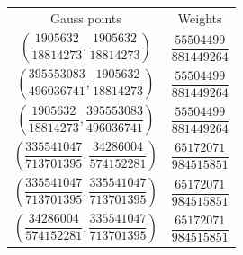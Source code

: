 \documentclass[12pt]{article}
\begin{document}
\begin{minipage}{0.58\textwidth}
  \vspace{0.3cm}
  \vfill\centering
  \begin{tabular}{c|c}
    Gauss points                                                              & Weights                       \\[15pt]
    $\left(\dfrac{1905632}{18814273},\dfrac{1905632}{18814273}\right)$        & $\dfrac{55504499}{881449264}$ \\[15pt]
    $\left(\dfrac{395553083}{496036741},\dfrac{1905632}{18814273}\right)$     & $\dfrac{55504499}{881449264}$ \\[15pt]
    $\left(\dfrac{1905632}{18814273}, \dfrac{395553083}{496036741}\right)$    & $\dfrac{55504499}{881449264}$ \\[15pt]
    $\left(\dfrac{335541047}{713701395}, \dfrac{34286004}{574152281}\right)$  & $\dfrac{65172071}{984515851}$ \\[15pt]
    $\left(\dfrac{335541047}{713701395}, \dfrac{335541047}{713701395}\right)$ & $\dfrac{65172071}{984515851}$ \\[15pt]
    $\left(\dfrac{34286004}{574152281}, \dfrac{335541047}{713701395}\right)$  & $\dfrac{65172071}{984515851}$ \\[15pt]
  \end{tabular}
  \vfill
\end{minipage}
\end{document}
